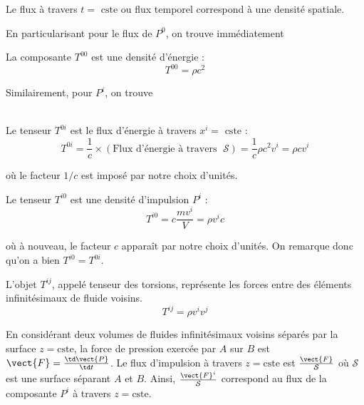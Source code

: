 \begin{theoremframe}
    \begin{defi}
        Le flux à travers $t=\text{ cste}$ ou flux temporel correspond à une densité spatiale. 
    \end{defi}
\end{theoremframe}
En particularisant pour le flux de $P^0$, on trouve immédiatement
\begin{theoremframe}
    \begin{propri}
        La composante $T^{00}$ est une densité d'énergie :
        \begin{equation}
            T^{00}= \rho c^2
        \end{equation}
    \end{propri}
\end{theoremframe}
Similairement, pour $P^i$, on trouve \\
\\
\begin{theoremframe}
    \begin{propri}
        Le tenseur $T^{0i} $ est le flux d'énergie à travers $x^{i}=\text{ cste}$ :
        \begin{equation}
            T^{0i} =\frac{1}{c} \times (\text{Flux d'énergie à travers } \; \mathcal{S}) = \frac{1}{c} \rho c^2 v^i = \rho c v^i
        \end{equation}
    \end{propri}
\end{theoremframe}
où le facteur $1/c$ est imposé par notre choix d'unités.
\begin{theoremframe}
    \begin{defi}
        Le tenseur $T^{i0}$ est une densité d'impulsion $P^{i}$ :
        \begin{equation}
            T^{i0} = c \frac{m v^i}{V} = \rho v^i c
        \end{equation}
    \end{defi}
\end{theoremframe}
où à nouveau, le facteur $c$ apparaît par notre choix d'unités. On remarque donc qu'on a bien $T^{i0} = T^{0i}$.

\begin{theoremframe}
    \begin{defi}
    L'objet $T^{ij}$, appelé tenseur des torsions, représente les forces entre des éléments infinitésimaux de fluide voisins.
    \begin{equation}
        T^{ij} = \rho v^i v^j
    \end{equation}
    \end{defi}
\end{theoremframe}
En considérant deux volumes de fluides infinitésimaux voisins séparés par la surface $z = \text{cste}$, la force de pression exercée par $A$ sur $B$ est $\vect{F} = \frac{\td\vect{P}}{\td t}$. Le flux d'impulsion à travers $z = \text{cste}$ est $\frac{\vect{F}}{\mathcal{S}}$ où $\mathcal{S}$ est une surface séparant $A$ et $B$. Ainsi, $\frac{\vect{F}^{i}}{\mathcal{S}}$ correspond au flux de la composante $P^{i}$ à travers $z = \text{cste}$.

